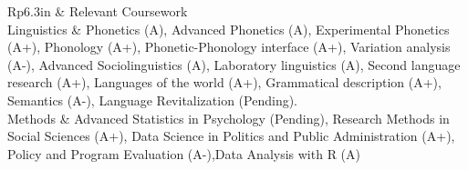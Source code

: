 \documentclass[letterpaper, 11pt]{article}
\newcommand{\headingfont}{\Large\color{MidnightBlue}}
\newenvironment{SectionTableSingleSpace}[1]{
	\renewcommand*{\arraystretch}{1.2}
	\setlength{\tabcolsep}{10pt}
	\begin{longtable}{Rp{6.3in}} & #1 \\[0.6em]}
{\end{longtable}\vspace{-.3cm}}
\begin{document}
\begin{SectionTableSingleSpace}{\headingfont Relevant Coursework}
Linguistics &
Phonetics (A), Advanced Phonetics (A), Experimental Phonetics (A+), Phonology (A+), \newline Phonetic-Phonology interface (A+), Variation analysis (A-), Advanced Sociolinguistics (A), \newline Laboratory linguistics (A),  Second language research (A+), Languages of the world (A+), \newline Grammatical description (A+), Semantics (A-), Language Revitalization (Pending).\\

Methods &
Advanced Statistics in Psychology (Pending), Research Methods in Social Sciences (A+), \newline Data Science in Politics and Public Administration (A+), Policy and Program Evaluation (A-),\newline Data Analysis with R (A)\\
\end{SectionTableSingleSpace}\vspace{-1.5cm}
\end{document}
